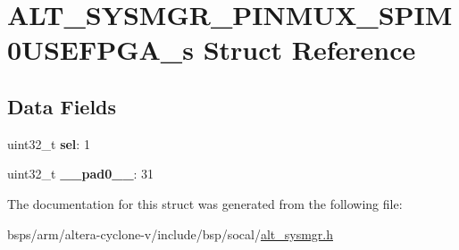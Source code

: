 \hypertarget{structALT__SYSMGR__PINMUX__SPIM0USEFPGA__s}{}\section{A\+L\+T\+\_\+\+S\+Y\+S\+M\+G\+R\+\_\+\+P\+I\+N\+M\+U\+X\+\_\+\+S\+P\+I\+M0\+U\+S\+E\+F\+P\+G\+A\+\_\+s Struct Reference}
\label{structALT__SYSMGR__PINMUX__SPIM0USEFPGA__s}
\subsection*{Data Fields}
\begin{DoxyCompactItemize}
\item 
\mbox{\label{structALT__SYSMGR__PINMUX__SPIM0USEFPGA__s_a9d6b9332fe42f6a940770efe60bc4233}} 
uint32\+\_\+t {\bfseries sel}\+: 1
\item 
\mbox{\label{structALT__SYSMGR__PINMUX__SPIM0USEFPGA__s_a030e45941ce8817380b3dfaea80ffab2}} 
uint32\+\_\+t {\bfseries \+\_\+\+\_\+pad0\+\_\+\+\_\+}\+: 31
\end{DoxyCompactItemize}


The documentation for this struct was generated from the following file\+:\begin{DoxyCompactItemize}
\item 
bsps/arm/altera-\/cyclone-\/v/include/bsp/socal/\mbox{\hyperlink{alt__sysmgr_8h}{alt\+\_\+sysmgr.\+h}}\end{DoxyCompactItemize}
